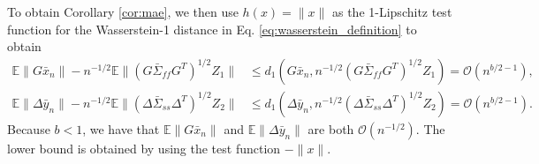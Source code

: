 To obtain Corollary \ref{cor:mae}, we then use $h(x) = \lVert x \rVert$ as the 1-Lipschitz test function for the Wasserstein-1 distance in Eq. \eqref{eq:wasserstein_definition} to obtain
\begin{equation}
    \begin{split}
        \mathbb{E}\lVert G \bar{x}_n\rVert - n^{-1/2} \mathbb{E} \lVert (G \bar{\Sigma}_{ff} G^T)^{1/2} Z_1 \rVert 
        &\leq d_1 \left(G \bar{x}_n, n^{-1/2}(G \bar{\Sigma}_{ff} G^T)^{1/2} Z_1 \right) = \mathcal{O}(n^{b/2 - 1}) ,
        \\
        \mathbb{E}\lVert \Delta \bar{y}_n \rVert - n^{-1/2} \mathbb{E} \lVert (\Delta \bar{\Sigma}_{ss} \Delta^T)^{1/2} Z_2 \rVert 
        &\leq d_1 \left(\Delta \bar{y}_n, n^{-1/2} (\Delta \bar{\Sigma}_{ss} \Delta^T)^{1/2} Z_2 \right) = \mathcal{O}(n^{b/2 - 1}) .
    \end{split}
\end{equation}
Because $b < 1$, we have that $\mathbb{E} \lVert G \bar{x}_n \rVert$ and $\mathbb{E} \lVert \Delta \bar{y}_n \rVert$ are both $\mathcal{O}(n^{-1/2})$.
The lower bound is obtained by using the test function $-\lVert x \rVert$. 
